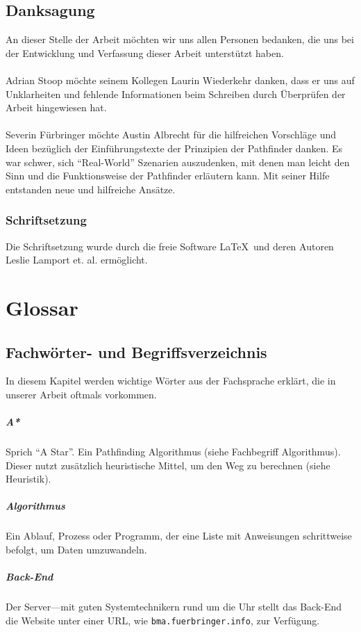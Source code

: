 \section{Danksagung}
An dieser Stelle der Arbeit möchten wir uns allen Personen bedanken, die uns bei der Entwicklung und Verfassung dieser Arbeit unterstützt haben.
\\\\
Adrian Stoop möchte seinem Kollegen Laurin Wiederkehr danken, dass er uns auf Unklarheiten und fehlende Informationen beim Schreiben durch Überprüfen der Arbeit hingewiesen hat.
\\\\
Severin Fürbringer möchte Austin Albrecht für die hilfreichen Vorschläge und Ideen bezüglich der Einführungstexte der Prinzipien der Pathfinder danken. Es war schwer, sich ``Real-World'' Szenarien auszudenken, mit denen man leicht den Sinn und die Funktionsweise der Pathfinder erläutern kann. Mit seiner Hilfe entstanden neue und hilfreiche Ansätze.


\subsection{Schriftsetzung}
Die Schriftsetzung wurde durch die freie Software \LaTeX\  und deren Autoren Leslie Lamport et. al. ermöglicht.

\chapter{Glossar}
\section*{Fachwörter- und Begriffsverzeichnis}
In diesem Kapitel werden wichtige Wörter aus der Fachsprache erklärt, die in unserer Arbeit oftmals vorkommen.
\paragraph{A*} Sprich ``A Star''. Ein Pathfinding Algorithmus (siehe Fachbegriff Algorithmus). Dieser nutzt zusätzlich heuristische Mittel, um den Weg zu berechnen (siehe Heuristik).
\paragraph{Algorithmus} Ein Ablauf, Prozess oder Programm, der eine Liste mit Anweisungen schrittweise befolgt, um Daten umzuwandeln.
\paragraph{Back-End} Der Server---mit guten Systemtechnikern rund um die Uhr stellt das Back-End die Website unter einer URL, wie \texttt{bma.fuerbringer.info}, zur Verfügung.

